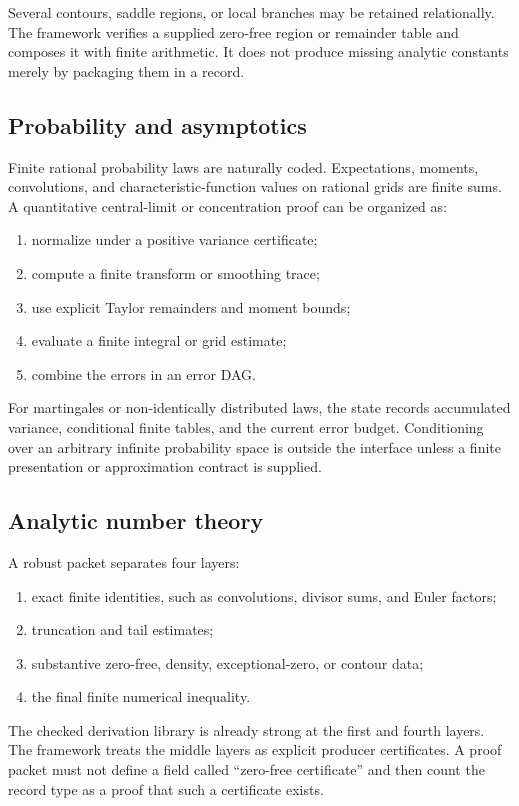 Several contours, saddle regions, or local branches may be retained relationally.  The framework verifies a supplied zero-free region or remainder table and composes it with finite arithmetic.  It does not produce missing analytic constants merely by packaging them in a record.

\subsection{Probability and asymptotics}

Finite rational probability laws are naturally coded.  Expectations, moments, convolutions, and characteristic-function values on rational grids are finite sums.  A quantitative central-limit or concentration proof can be organized as:
\begin{enumerate}
\item normalize under a positive variance certificate;
\item compute a finite transform or smoothing trace;
\item use explicit Taylor remainders and moment bounds;
\item evaluate a finite integral or grid estimate;
\item combine the errors in an error DAG.
\end{enumerate}

For martingales or non-identically distributed laws, the state records accumulated variance, conditional finite tables, and the current error budget.  Conditioning over an arbitrary infinite probability space is outside the interface unless a finite presentation or approximation contract is supplied.

\subsection{Analytic number theory}

A robust packet separates four layers:
\begin{enumerate}
\item exact finite identities, such as convolutions, divisor sums, and Euler factors;
\item truncation and tail estimates;
\item substantive zero-free, density, exceptional-zero, or contour data;
\item the final finite numerical inequality.
\end{enumerate}
The checked derivation library is already strong at the first and fourth layers.  The framework treats the middle layers as explicit producer certificates.  A proof packet must not define a field called ``zero-free certificate'' and then count the record type as a proof that such a certificate exists.

